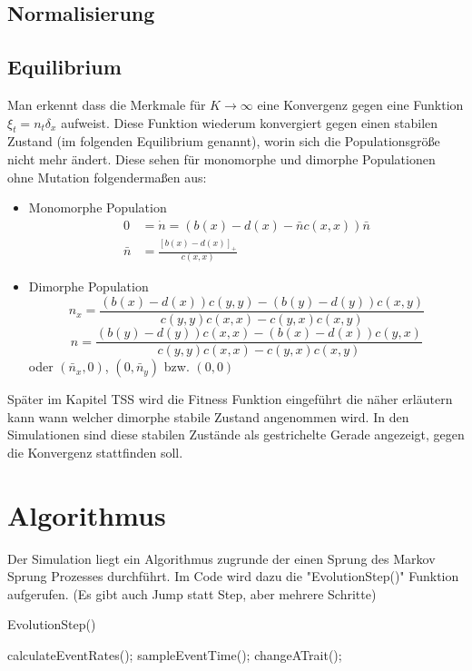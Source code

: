 \documentclass[11pt, a4paper, german]{article}
\begin{document}
	
	\subsection{Normalisierung}
	
	\subsection{Equilibrium}
	Man erkennt dass die Merkmale für $ K \to \infty $ eine Konvergenz gegen eine Funktion $ \xi_t = n_t \delta_x $ aufweist. Diese Funktion wiederum konvergiert gegen einen stabilen Zustand (im folgenden Equilibrium genannt), worin sich die Populationsgröße nicht mehr ändert. Diese sehen für monomorphe und dimorphe Populationen ohne Mutation folgendermaßen aus:
	\begin{itemize}
		\item Monomorphe Population\\
			\begin{align*}
			0 & = \dot{n} = (b(x) - d(x) - \bar{n}c(x,x))\bar{n}\\
			\bar{n} &= \frac{\left[ b(x)-d(x) \right]_+}{c(x,x)}
			\end{align*}
		\item Dimorphe Population\\
			\[ n_x = \frac{(b(x) - d(x))c(y,y)-(b(y)-d(y))c(x,y)}{c(y,y)c(x,x) - c(y,x)c(x,y)} \]
			\[ n = \frac{(b(y) - d(y))c(x,x)-(b(x)-d(x))c(y,x)}{c(y,y)c(x,x) - c(y,x)c(x,y)} \]
			oder $ (\bar{n}_x, 0)$, $ (0, \bar{n}_y)$ bzw. $ (0,0) $
	\end{itemize}
	Später im Kapitel TSS wird die Fitness Funktion eingeführt die näher erläutern kann wann welcher dimorphe stabile Zustand angenommen wird.
	In den Simulationen sind diese stabilen Zustände als gestrichelte Gerade angezeigt, gegen die Konvergenz stattfinden soll.

\section{Algorithmus}
	Der Simulation liegt ein Algorithmus zugrunde der einen Sprung des Markov Sprung Prozesses durchführt. Im Code wird dazu die "{}EvolutionStep()"{} Funktion aufgerufen. (Es gibt auch Jump statt Step, aber mehrere Schritte)
	\begin{algorithm}[H]
		\caption{EvolutionStep()}
		\begin{algorithmic}[1]
			\STATE calculateEventRates();
			\STATE sampleEventTime();
			\STATE changeATrait();
		\end{algorithmic}
	\end{algorithm}
	
\end{document}

